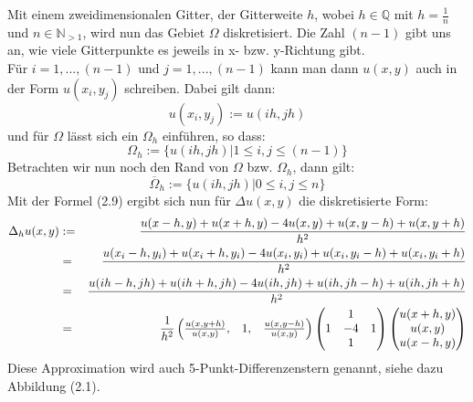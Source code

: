 Mit einem zweidimensionalen Gitter, der Gitterweite $h$, wobei $h \in \mathbb{Q}$ mit $h = \frac {1} {n}$ und $n \in \mathbb{N}_{>1}$, wird nun das Gebiet $\Omega$ diskretisiert. Die Zahl $(n-1)$ gibt uns an, wie viele Gitterpunkte es jeweils in x- bzw. y-Richtung gibt.\\

Für $i = 1,...,(n-1)$ und $j = 1,...,(n-1)$ kann man dann $u(x,y)$ auch in der Form $u(x_{i},y_{j})$ schreiben. Dabei gilt dann:
\begin{equation}
u(x_{i},y_{j}) := u(ih,jh)
\end{equation}
und für $\Omega$ lässt sich ein $\Omega_{h}$ einführen, so dass:
\begin{equation}
\Omega_{h} := \{u(ih, jh) | 1 \le i,j \le (n-1)\}
\end{equation}
Betrachten wir nun noch den Rand von $\Omega$ bzw. $\Omega_{h}$, dann gilt:
\begin{equation}
\overline \Omega_{h} := \{u(ih, jh) | 0 \le i,j \le n\}
\end{equation}
Mit der Formel (2.9) ergibt sich nun für $\Delta u(x,y)$ die diskretisierte Form:
\begin{eqnarray}
\Delta_{h} u(x,y) &:=& \frac {u(x-h,y) + u(x+h,y) - 4u(x,y) + u(x,y-h) + u(x,y+h)} {h^{2}} \notag \\
&=& \frac {u(x_{i}-h,y_{i}) + u(x_{i}+h,y_{i}) - 4u(x_{i},y_{i}) + u(x_{i},y_{i}-h) + u(x_{i},y_{i}+h)} {h^{2}} \notag \\
&=& \frac {u(ih-h,jh)+u(ih+h,jh)-4u(ih,jh)+u(ih,jh-h)+u(ih,jh+h)} {h^{2}} \notag \\
&=& \frac {1} {h^{2}}
\begin{pmatrix}
\frac {u(x,y+h)} {u(x,y)}, & 1, & \frac {u(x,y-h)} {u(x,y)}
\end{pmatrix}
\begin{pmatrix}
  & 1 & \\
1 & -4 & 1 \\
  & 1 & 
\end{pmatrix}
\begin{pmatrix}
u(x+h,y) \\
u(x,y) \\
u(x-h,y)
\end{pmatrix}
\end{eqnarray}
Diese Approximation wird auch 5-Punkt-Differenzenstern genannt, siehe dazu Abbildung (2.1).


